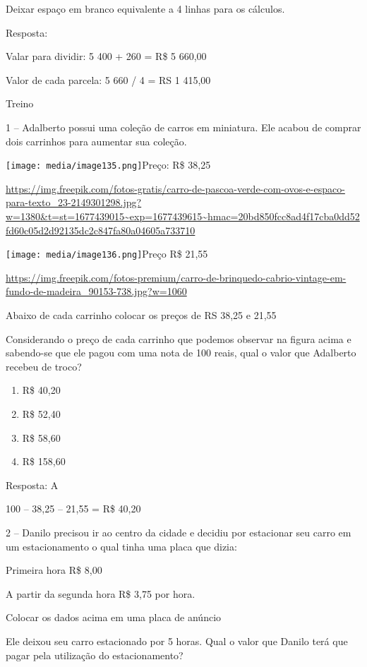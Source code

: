 Deixar espaço em branco equivalente a 4 linhas para os cálculos.

Resposta:

Valar para dividir: 5 400 + 260 = R\$ 5 660,00

Valor de cada parcela: 5 660 / 4 = RS 1 415,00

Treino

1 -- Adalberto possui uma coleção de carros em miniatura. Ele acabou de
comprar dois carrinhos para aumentar sua coleção.

\texttt{[image: media/image135.png]}Preço:
R\$ 38,25

\url{https://img.freepik.com/fotos-gratis/carro-de-pascoa-verde-com-ovos-e-espaco-para-texto_23-2149301298.jpg?w=1380\&t=st=1677439015~exp=1677439615~hmac=20bd850fcc8ad4f17cba0dd52fd60c05d2d92135dc2c847fa80a04605a733710}

\texttt{[image: media/image136.png]}Preço
R\$ 21,55

\url{https://img.freepik.com/fotos-premium/carro-de-brinquedo-cabrio-vintage-em-fundo-de-madeira_90153-738.jpg?w=1060}

Abaixo de cada carrinho colocar os preços de RS 38,25 e 21,55

Considerando o preço de cada carrinho que podemos observar na figura
acima e sabendo-se que ele pagou com uma nota de 100 reais, qual o valor
que Adalberto recebeu de troco?

\begin{enumerate}
\def\labelenumi{\alph{enumi})}
\item
  R\$ 40,20
\item
  R\$ 52,40
\item
  R\$ 58,60
\item
  R\$ 158,60
\end{enumerate}

Resposta: A

100 -- 38,25 -- 21,55 = R\$ 40,20

2 -- Danilo precisou ir ao centro da cidade e decidiu por estacionar seu
carro em um estacionamento o qual tinha uma placa que dizia:

Primeira hora R\$ 8,00

A partir da segunda hora R\$ 3,75 por hora.

Colocar os dados acima em uma placa de anúncio

Ele deixou seu carro estacionado por 5 horas. Qual o valor que Danilo
terá que pagar pela utilização do estacionamento?

